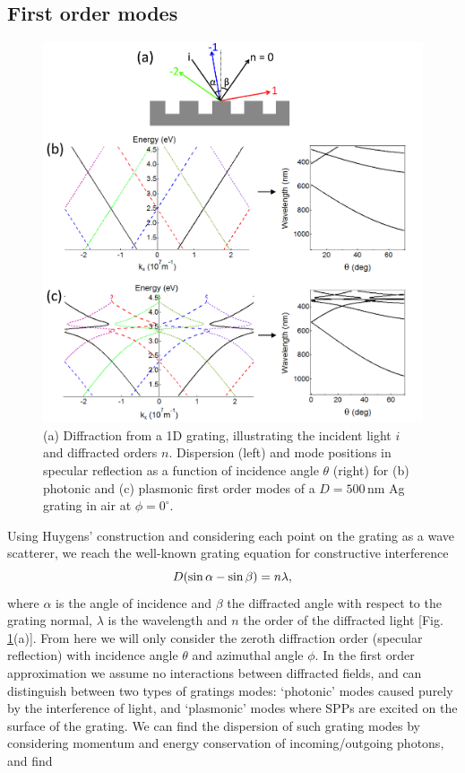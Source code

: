 \subsection{First order modes}
\begin{figure}[h!p] 
\centering    
\includegraphics[width=\textwidth]{Fig3}
\caption{(a) Diffraction from a 1D grating, illustrating the incident light $i$ and diffracted orders $n$. Dispersion (left) and mode positions in specular reflection as a function of incidence angle $\theta$ (right) for (b) photonic and (c) plasmonic first order modes of a $D=500$\,nm Ag grating in air at $\phi=0^{\circ}$.}
\label{3Fig3}
\end{figure}
Using Huygens' construction and considering each point on the grating as a wave scatterer, we reach the well-known grating equation for constructive interference
\begin{equation}
\centering
D(\sin\alpha-\sin\beta) = n\lambda ,
\label{GratingEq}
\end{equation}
where $\alpha$ is the angle of incidence and $\beta$ the diffracted angle with respect to the grating normal, $\lambda$ is the wavelength and $n$ the order of the diffracted light [Fig.\,\ref{3Fig3}(a)]. From here we will only consider the zeroth diffraction order (specular reflection) with incidence angle $\theta$ and azimuthal angle $\phi$. In the first order approximation we assume no interactions between diffracted fields, and can distinguish between two types of gratings modes: `photonic' modes caused purely by the interference of light, and `plasmonic' modes where SPPs are excited on the surface of the grating. We can find the dispersion of such grating modes by considering momentum and energy conservation of incoming/outgoing photons, and find
